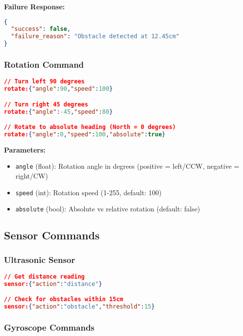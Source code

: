 \textbf{Failure Response:}
\begin{lstlisting}[language=json]
{
  "success": false,
  "failure_reason": "Obstacle detected at 12.45cm"
}
\end{lstlisting}

\subsubsection{Rotation Command}

\begin{lstlisting}[language=json,caption=Rotation Command Examples]
// Turn left 90 degrees
rotate:{"angle":90,"speed":100}

// Turn right 45 degrees
rotate:{"angle":-45,"speed":80}

// Rotate to absolute heading (North = 0 degrees)
rotate:{"angle":0,"speed":100,"absolute":true}
\end{lstlisting}

\textbf{Parameters:}
\begin{itemize}
    \item \texttt{angle} (float): Rotation angle in degrees (positive = left/CCW, negative = right/CW)
    \item \texttt{speed} (int): Rotation speed (1-255, default: 100)
    \item \texttt{absolute} (bool): Absolute vs relative rotation (default: false)
\end{itemize}

\subsection{Sensor Commands}

\subsubsection{Ultrasonic Sensor}

\begin{lstlisting}[language=json,caption=Sensor Command Examples]
// Get distance reading
sensor:{"action":"distance"}

// Check for obstacles within 15cm
sensor:{"action":"obstacle","threshold":15}
\end{lstlisting}

\subsubsection{Gyroscope Commands}

